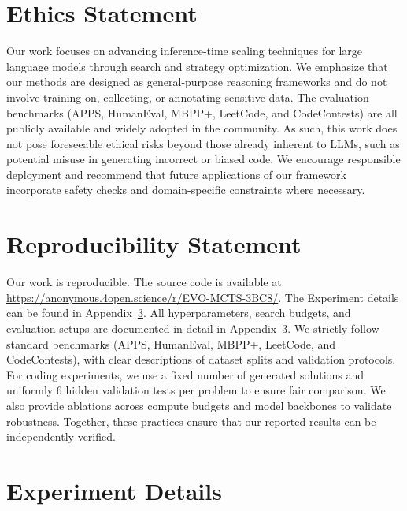 \documentclass{article} %
\theoremstyle{definition}
\theoremstyle{remark}
\begin{document}
\newpage

\section{Ethics Statement}
Our work focuses on advancing inference-time scaling techniques for large language models through search and strategy optimization. We emphasize that our methods are designed as general-purpose reasoning frameworks and do not involve training on, collecting, or annotating sensitive data. The evaluation benchmarks (APPS, HumanEval, MBPP+, LeetCode, and CodeContests) are all publicly available and widely adopted in the community. As such, this work does not pose foreseeable ethical risks beyond those already inherent to LLMs, such as potential misuse in generating incorrect or biased code. We encourage responsible deployment and recommend that future applications of our framework incorporate safety checks and domain-specific constraints where necessary.




\section{Reproducibility Statement}

Our work is reproducible. The source code is available at \url{https://anonymous.4open.science/r/EVO-MCTS-3BC8/}. The Experiment details can be found in Appendix~\ref{experiment111}. All hyperparameters, search budgets, and evaluation setups are documented in detail in Appendix~\ref{experiment111}. We strictly follow standard benchmarks (APPS, HumanEval, MBPP+, LeetCode, and CodeContests), with clear descriptions of dataset splits and validation protocols. For coding experiments, we use a fixed number of generated solutions and uniformly 6 hidden validation tests per problem to ensure fair comparison. We also provide ablations across compute budgets and model backbones to validate robustness. Together, these practices ensure that our reported results can be independently verified.









\appendix


\clearpage
\tableofcontents
\clearpage
\appendix



\section{Experiment Details}
\label{experiment111}
\end{document}
